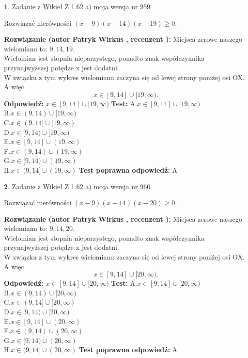 \documentclass[12pt, a4paper]{article}
\theoremstyle{definition} %
\newtheorem{zad}{}
\newcommand{\zadStart}[1]{\begin{zad}#1\newline}
\newcommand{\zadStop}{\end{zad}}
\newcommand{\rozwStart}[2]{\noindent \textbf{Rozwiązanie (autor #1 , recenzent #2): }\newline}
\newcommand{\rozwStop}{\newline}
\newcommand{\odpStart}{\noindent \textbf{Odpowiedź:}\newline}
\newcommand{\odpStop}{\newline}
\newcommand{\testStart}{\noindent \textbf{Test:}\newline}
\newcommand{\testStop}{\newline}
\newcommand{\kluczStart}{\noindent \textbf{Test poprawna odpowiedź:}\newline}
\newcommand{\kluczStop}{\newline}
\begin{document}
\zadStart{Zadanie z Wikieł Z 1.62 a) moja wersja nr 959}

Rozwiązać nierówności $(x-9)(x-14)(x-19)\ge0$.
\zadStop
\rozwStart{Patryk Wirkus}{}
Miejsca zerowe naszego wielomianu to: $9, 14, 19$.\\
Wielomian jest stopnia nieparzystego, ponadto znak współczynnika przy\linebreak najwyższej potędze x jest dodatni.\\ W związku z tym wykres wielomianu zaczyna się od lewej strony poniżej osi OX. A więc $$x \in [9,14] \cup [19,\infty).$$
\rozwStop
\odpStart
$x \in [9,14] \cup [19,\infty)$
\odpStop
\testStart
A.$x \in [9,14] \cup [19,\infty)$\\
B.$x \in (9,14) \cup [19,\infty)$\\
C.$x \in (9,14] \cup [19,\infty)$\\
D.$x \in [9,14) \cup [19,\infty)$\\
E.$x \in [9,14] \cup (19,\infty)$\\
F.$x \in (9,14) \cup (19,\infty)$\\
G.$x \in [9,14) \cup (19,\infty)$\\
H.$x \in (9,14] \cup (19,\infty)$
\testStop
\kluczStart
A
\kluczStop



\zadStart{Zadanie z Wikieł Z 1.62 a) moja wersja nr 960}

Rozwiązać nierówności $(x-9)(x-14)(x-20)\ge0$.
\zadStop
\rozwStart{Patryk Wirkus}{}
Miejsca zerowe naszego wielomianu to: $9, 14, 20$.\\
Wielomian jest stopnia nieparzystego, ponadto znak współczynnika przy\linebreak najwyższej potędze x jest dodatni.\\ W związku z tym wykres wielomianu zaczyna się od lewej strony poniżej osi OX. A więc $$x \in [9,14] \cup [20,\infty).$$
\rozwStop
\odpStart
$x \in [9,14] \cup [20,\infty)$
\odpStop
\testStart
A.$x \in [9,14] \cup [20,\infty)$\\
B.$x \in (9,14) \cup [20,\infty)$\\
C.$x \in (9,14] \cup [20,\infty)$\\
D.$x \in [9,14) \cup [20,\infty)$\\
E.$x \in [9,14] \cup (20,\infty)$\\
F.$x \in (9,14) \cup (20,\infty)$\\
G.$x \in [9,14) \cup (20,\infty)$\\
H.$x \in (9,14] \cup (20,\infty)$
\testStop
\kluczStart
A
\kluczStop
\end{document}

